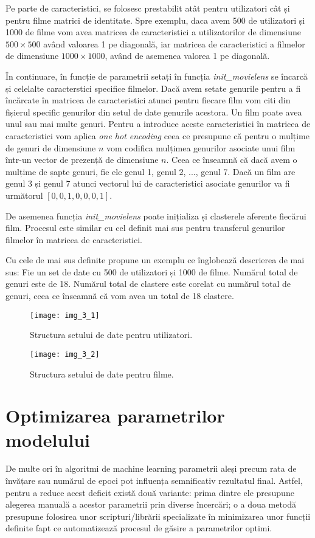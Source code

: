 Pe parte de caracteristici, se folosesc prestabilit atât pentru utilizatori cât și pentru filme matrici de identitate. Spre exemplu, daca avem 500 de utilizatori și 1000 de filme vom avea matricea de caracteristici a utilizatorilor de dimensiune $500 \times 500$ având valoarea 1 pe diagonală, iar matricea de caracteristici a filmelor de dimensiune $1000 \times 1000$, având de asemenea valorea 1 pe diagonală.

În continuare, în funcție de parametrii setați în funcția \textit{init\_movielens} se încarcă și celelalte caracterstici specifice filmelor. Dacă avem setate genurile pentru a fi încărcate în matricea de caracteristici atunci pentru fiecare film vom citi din fișierul specific genurilor din setul de date genurile acestora. Un film poate avea unul sau mai multe genuri. Pentru a introduce aceste caracteristici în matricea de caracteristici vom aplica \textit{one hot encoding} ceea ce presupune că pentru o mulțime de genuri de dimensiune $n$ vom codifica mulțimea genurilor asociate unui film într-un vector de prezență de dimensiune $n$. Ceea ce înseamnă că dacă avem o mulțime de șapte genuri, fie ele genul 1, genul 2, ..., genul 7. Dacă un film are genul 3 și genul 7 atunci vectorul lui de caracteristici asociate genurilor va fi următorul $[0, 0, 1, 0, 0, 0, 1]$.

De asemenea funcția \textit{init\_movielens} poate inițializa și clasterele aferente fiecărui film. Procesul este similar cu cel definit mai sus pentru transferul genurilor filmelor în matricea de caracteristici.

Cu cele de mai sus definite propune un exemplu ce înglobează descrierea de mai sus:
Fie un set de date cu 500 de utilizatori și 1000 de filme. Numărul total de genuri este de 18. Numărul total de clastere este corelat cu numărul total de genuri, ceea ce înseamnă că vom avea un total de 18 clastere.
\begin{figure}[!h]
	\centering
	\texttt{[image: img\_3\_1]}
	\caption[Structura setului de date pentru utilizatori]{Structura setului de date pentru utilizatori.}
\end{figure} 

\begin{figure}[!h]
	\centering
	\texttt{[image: img\_3\_2]}
	\caption[Structura setului de date pentru filme]{Structura setului de date pentru filme.}
\end{figure} 

\section{Optimizarea parametrilor modelului}
De multe ori în algoritmi de machine learning parametrii aleși precum rata de învățare sau numărul de epoci pot influența semnificativ rezultatul final. Astfel, pentru a reduce acest deficit există două variante: prima dintre ele presupune alegerea manuală a acestor parametrii prin diverse încercări; o a doua metodă presupune folosirea unor scripturi/librării specializate în minimizarea unor funcții definite fapt ce automatizează procesul de găsire a parametrilor optimi.

